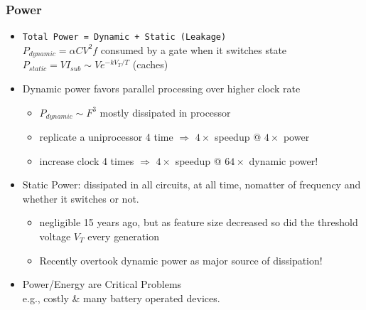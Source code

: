 \documentclass{beamer}
\newcommand{\emp}[1]{\textcolor{DikuRed}{ #1}}
\begin{document}
\begin{frame}[fragile,t]
\frametitle{Power}

\begin{itemize}
    \item \emp{\tt Total Power = Dynamic + Static (Leakage)}\\
                        $P_{dynamic} = \alpha C V^2 f$ 
                        consumed by a gate when it switches state\\
                        $P_{static}  = V I_{sub} \sim V e^{-k V_T / T}$ 
                        (caches)\medskip

    \item Dynamic power 
            favors parallel processing over higher clock rate
            \begin{itemize}
                \item $P_{dynamic} \sim F^3$ mostly dissipated in processor
                \item replicate a uniprocessor 4 time $\Rightarrow$ 
                        $4\times$ speedup @ $4\times$ power
                \item increase clock 4 times $\Rightarrow$ 
                        $4\times$ speedup @ $64\times$ dynamic power!
            \end  {itemize}\medskip

    \item Static Power: dissipated in all circuits,  
                at all time, nomatter of frequency and whether
                it switches or not.
            \begin{itemize}
                \item negligible 15 years ago, but as feature size 
                        decreased so did the threshold voltage $V_T$ 
                        every generation
                \item \alert{Recently overtook dynamic power as major 
                        source of dissipation!}
            \end{itemize}\medskip

    \item \emp{Power/Energy are Critical Problems}\\ 
                e.g., costly \& many battery operated devices.
%
\end  {itemize}


\end{frame}
\end{document}
